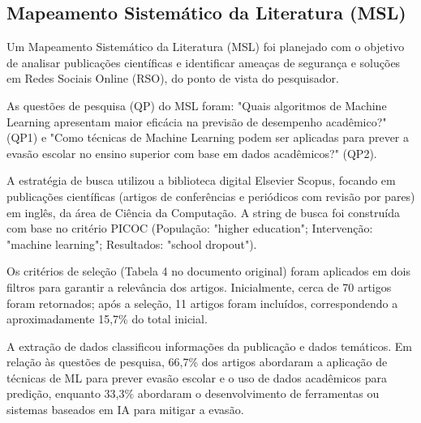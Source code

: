 \documentclass[12pt]{article}
\begin{document}
\subsection{Mapeamento Sistemático da Literatura (MSL)}
Um Mapeamento Sistemático da Literatura (MSL) foi planejado com o objetivo de analisar publicações científicas e identificar ameaças de segurança e soluções em Redes Sociais Online (RSO), do ponto de vista do pesquisador.

As questões de pesquisa (QP) do MSL foram: "Quais algoritmos de Machine Learning apresentam maior eficácia na previsão de desempenho acadêmico?" (QP1) e "Como técnicas de Machine Learning podem ser aplicadas para prever a evasão escolar no ensino superior com base em dados acadêmicos?" (QP2).

A estratégia de busca utilizou a biblioteca digital Elsevier Scopus, focando em publicações científicas (artigos de conferências e periódicos com revisão por pares) em inglês, da área de Ciência da Computação. A string de busca foi construída com base no critério PICOC (População: "higher education"; Intervenção: "machine learning"; Resultados: "school dropout").

Os critérios de seleção (Tabela 4 no documento original) foram aplicados em dois filtros para garantir a relevância dos artigos. Inicialmente, cerca de 70 artigos foram retornados; após a seleção, 11 artigos foram incluídos, correspondendo a aproximadamente 15,7\% do total inicial.

A extração de dados classificou informações da publicação e dados temáticos. Em relação às questões de pesquisa, 66,7\% dos artigos abordaram a aplicação de técnicas de ML para prever evasão escolar e o uso de dados acadêmicos para predição, enquanto 33,3\% abordaram o desenvolvimento de ferramentas ou sistemas baseados em IA para mitigar a evasão.

\renewcommand{\refname}{Referências}


\end{document}
